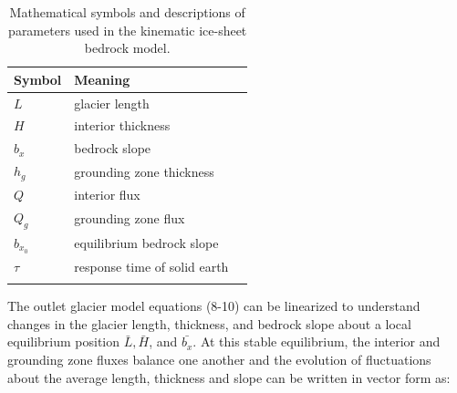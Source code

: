 \documentclass[tc, manuscript]{copernicus}
\begin{document}
\begin{table}[h]
    \begin{tabular}{lll}
        Symbol & Meaning \\
        \hline
        $L$ & glacier length \\
        $H$ & interior thickness \\
        $b_x$ & bedrock slope \\
        $h_g$ & grounding zone thickness \\
        $Q$ & interior flux \\
        $Q_g$ & grounding zone flux \\
        $b_{x_0}$ & equilibrium bedrock slope \\
        $\tau$ & response time of solid earth  \\
        \\
        
    \end{tabular}
    
    \caption{Mathematical symbols and descriptions of parameters used in the kinematic ice-sheet bedrock model.}
\end{table}

The outlet glacier model equations (8-10)  can be linearized to understand changes in the glacier length, thickness, and bedrock slope about a local equilibrium position $\bar{L}, \bar{H}$, and $\bar{b_x}$. At this stable equilibrium, the interior and grounding zone fluxes balance one another and the evolution of fluctuations about the average length, thickness and slope can be written in vector form as:
\end{document}
